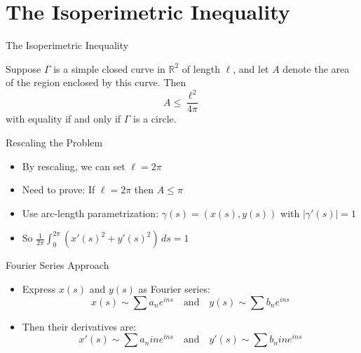\documentclass{beamer}
\begin{document}
\section{The Isoperimetric Inequality}

\begin{frame}{The Isoperimetric Inequality}
    \begin{theorem}
        Suppose $\Gamma$ is a simple closed curve in $\mathbb{R}^2$ of length $\ell$, and let $A$ denote the area of the region enclosed by this curve. Then
        $$A \leq \frac{\ell^2}{4\pi}$$
        with equality if and only if $\Gamma$ is a circle.
    \end{theorem}
\end{frame}

\begin{frame}{Rescaling the Problem}
    \begin{itemize}
        \item By rescaling, we can set $\ell = 2\pi$
        \item Need to prove: If $\ell = 2\pi$ then $A \leq \pi$
        \item Use arc-length parametrization: $\gamma(s) = (x(s), y(s))$ with $|\gamma'(s)| = 1$
        \item So $\frac{1}{2\pi}\int_0^{2\pi} (x'(s)^2 + y'(s)^2) \, ds = 1$
    \end{itemize}
\end{frame}

\begin{frame}{Fourier Series Approach}
    \begin{itemize}
        \item Express $x(s)$ and $y(s)$ as Fourier series:
        $$x(s) \sim \sum a_n e^{ins} \quad \text{and} \quad y(s) \sim \sum b_n e^{ins}$$
        \item Then their derivatives are:
        $$x'(s) \sim \sum a_n ine^{ins} \quad \text{and} \quad y'(s) \sim \sum b_n ine^{ins}$$
        
    \end{itemize}
\end{frame}
\end{document}
